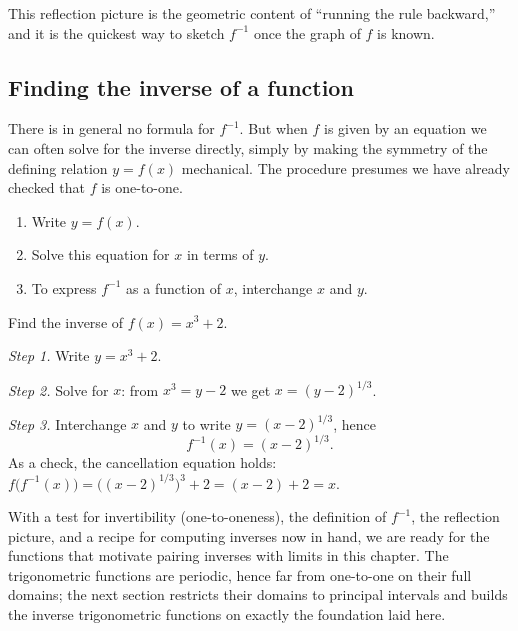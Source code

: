 This reflection picture is the geometric content of ``running the rule backward,'' and it is the quickest way to sketch \(f^{-1}\) once the graph of \(f\) is known.

\subsection{Finding the inverse of a function}

There is in general no formula for \(f^{-1}\). But when \(f\) is given by an equation we can often solve for the inverse directly, simply by making the symmetry of the defining relation \(y = f(x)\) mechanical. The procedure presumes we have already checked that \(f\) is one-to-one.

\begin{strategy}\label{strat:find-inverse}
\begin{enumerate}
  \item Write \(y = f(x)\).
  \item Solve this equation for \(x\) in terms of \(y\).
  \item To express \(f^{-1}\) as a function of \(x\), interchange \(x\) and \(y\).
\end{enumerate}
\end{strategy}

\begin{workedexample}
\begin{example}\label{ex:inverse-cubic-plus-two}
Find the inverse of \(f(x) = x^{3} + 2\).
\end{example}

\begin{solution}
\emph{Step 1.} Write \(y = x^{3} + 2\).

\emph{Step 2.} Solve for \(x\): from \(x^{3} = y - 2\) we get \(x = (y - 2)^{1/3}\).

\emph{Step 3.} Interchange \(x\) and \(y\) to write \(y = (x - 2)^{1/3}\), hence
\[
f^{-1}(x) = (x - 2)^{1/3}.
\]
As a check, the cancellation equation holds: \(f\bigl(f^{-1}(x)\bigr) = \bigl((x - 2)^{1/3}\bigr)^{3} + 2 = (x - 2) + 2 = x\).
\end{solution}
\end{workedexample}

With a test for invertibility (one-to-oneness), the definition of \(f^{-1}\), the reflection picture, and a recipe for computing inverses now in hand, we are ready for the functions that motivate pairing inverses with limits in this chapter. The trigonometric functions are periodic, hence far from one-to-one on their full domains; the next section restricts their domains to principal intervals and builds the inverse trigonometric functions on exactly the foundation laid here.

